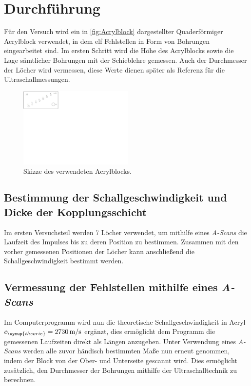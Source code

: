 \section{Durchführung}
\label{sec:Durchführung}

Für den Versuch wird ein in \autoref{fig:Acrylblock} dargestellter Quaderförmiger Acrylblock verwendet,
in dem elf Fehlstellen in Form von Bohrungen eingearbeitet sind.
Im ersten Schritt wird die Höhe des Acrylblocks sowie die Lage sämtlicher Bohrungen mit der Schieblehre gemessen.
Auch der Durchmesser der Löcher wird vermessen, diese Werte dienen später als Referenz für die Ultraschallmessungen.
\begin{figure}
    \centering
    \includegraphics[height=4cm]{content/pics/acrylblock.pdf}
    \caption{Skizze des verwendeten Acrylblocks.\cite{US2}}
    \label{fig:Acrylblock}
\end{figure}

\subsection{Bestimmung der Schallgeschwindigkeit und Dicke der Kopplungsschicht}
Im ersten Versuchsteil werden 7 Löcher verwendet, um mithilfe eines \textit{A-Scans} die Laufzeit des Impulses
bis zu deren Position zu bestimmen. Zusammen mit den vorher gemessenen Positionen der Löcher kann anschließend
die Schallgeschwindigkeit bestimmt werden.

\subsection{Vermessung der Fehlstellen mithilfe eines \textit{A-Scans}}
\label{sec:arschscan}
Im Computerprogramm wird nun die theoretische Schallgeschwindigkeit in Acryl
$c_{\symup{theorie}}=\qty{2730}{\metre\per\second}$ \cite{c_Acryl} ergänzt, dies ermöglicht dem Programm
die gemessenen Laufzeiten direkt als Längen anzugeben.
Unter Verwendung eines \textit{A-Scans} werden alle zuvor händisch bestimmten Maße nun erneut genommen,
indem der Block von der Ober- und Unterseite gescannt wird.
Dies ermöglicht zusätzlich, den Durchmesser der Bohrungen mithilfe der Ultraschalltechnik zu berechnen.

